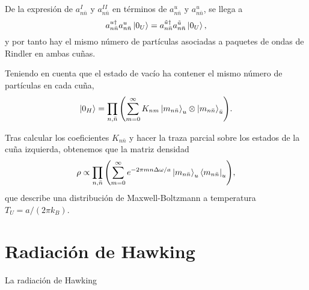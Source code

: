 De la expresión de $a_{n\bar n}^I$ y $a_{n\bar n}^{II}$ en términos de $a_{n\bar n}^u$ y $a_{n\bar n}^u$, se llega a 
\begin{equation}
  a_{n\bar n}^{u\dagger} a_{n\bar n}^u \ket{0_U} = a_{n\bar n}^{\tilde u\dagger}a_{n\bar n}^{\tilde u} \ket{0_U},
\end{equation}
y por tanto hay el mismo número de partículas asociadas a paquetes de ondas de Rindler en ambas
cuñas.

Teniendo en cuenta que el estado de vacío ha contener el mismo número de partículas en cada cuña,
\begin{equation}
  \ket{0_H} = \prod_{n,\bar n} \qty(\sum_{m=0}^\infty K_{nm} \ket{m_{n\bar n}}_u\otimes \ket{m_{n\bar n}}_{\bar u}).
\end{equation}



Tras calcular los coeficientes $K_{n \bar n}$ y hacer la traza parcial sobre los estados de
la cuña izquierda, obtenemos que la matriz densidad
\begin{equation}
  \rho  \propto \prod_{n,\bar n} \qty(\sum_{m=0}^\infty e^{-2\pi m n\Delta  \omega/a}\ket{m_{n\bar n}}_u \bra{m_{n\bar n}}_u),
\end{equation}
que describe una distribución de Maxwell-Boltzmann a temperatura $T_U=a/(2\pi k_B)$.




\section{Radiación de Hawking}
La radiación de Hawking



